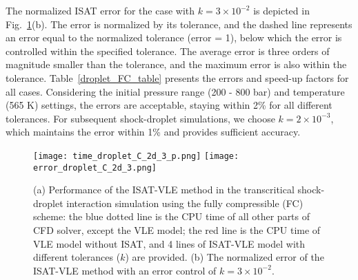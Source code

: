 The normalized ISAT error for the case with $k=3\times10^{-2}$ is depicted in Fig.~\ref{droplet_PE}(b). The error is normalized by its tolerance, and the dashed line represents an error equal to the normalized tolerance (error = 1), below which the error is controlled within the specified tolerance. The average error is three orders of magnitude smaller than the tolerance, and the maximum error is also within the tolerance. Table~\ref{droplet_FC_table} presents the errors and speed-up factors for all cases. Considering the initial pressure range (200 - 800 bar) and temperature (565 K) settings, the errors are acceptable, staying within 2\% for all different tolerances. For subsequent shock-droplet simulations, we choose $k=2 \times 10^{-3}$, which maintains the error within 1\% and provides sufficient accuracy.



\begin{figure}[htbp]
	\centering
	\texttt{[image: time\_droplet\_C\_2d\_3\_p.png]}
	\texttt{[image: error\_droplet\_C\_2d\_3.png]}
	\caption{(a) Performance of the ISAT-VLE method in the transcritical shock-droplet interaction simulation using the fully compressible (FC) scheme: the blue dotted line is the CPU time of all other parts of CFD solver, except the VLE model; the red line is the CPU time of VLE model without ISAT, and 4 lines of ISAT-VLE model with different tolerances ($k$) are provided. (b) The normalized error of the ISAT-VLE method with an error control of $k = 3 \times 10^{-2}$.}
	\label{droplet_PE}
\end{figure}



